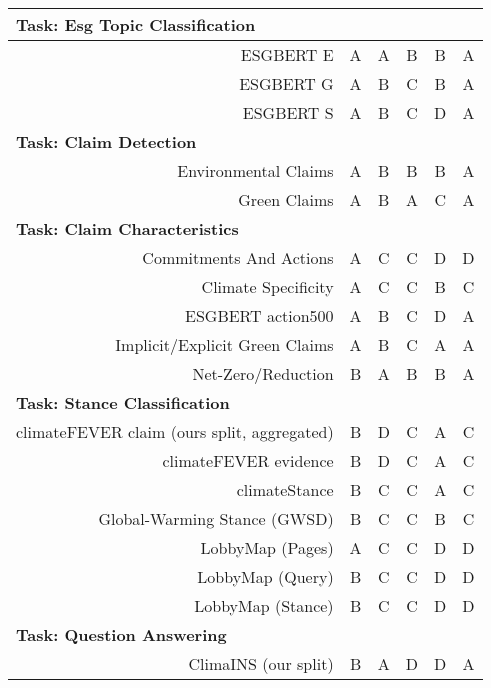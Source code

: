 \begin{table}[ht]
\begin{tabular}{rcccc|c}
\multicolumn{2}{l}{\textbf{Task: Esg Topic Classification}} \\
\hline
ESGBERT E \cite{schimanski_bridging_2023} & A & A & B & B & A \\
ESGBERT G \cite{schimanski_bridging_2023} & A & B & C & B & A \\
ESGBERT S \cite{schimanski_bridging_2023} & A & B & C & D & A \\
\multicolumn{2}{l}{\textbf{Task: Claim Detection}} \\
\hline
Environmental Claims \cite{stammbach_environmental_2023} & A & B & B & B & A \\
Green Claims \cite{vinicius_woloszyn_towards_2021} & A & B & A & C & A \\
\multicolumn{2}{l}{\textbf{Task: Claim Characteristics}} \\
\hline
Commitments And Actions \cite{bingler2023cheaptalkspecificitysentiment} & A & C & C & D & D \\
Climate Specificity \cite{bingler2023cheaptalkspecificitysentiment} & A & C & C & B & C \\
ESGBERT action500 \cite{schimanski_bridging_2023} & A & B & C & D & A \\
Implicit/Explicit Green Claims \cite{vinicius_woloszyn_towards_2021} & A & B & C & A & A \\
Net-Zero/Reduction \cite{tobias_schimanski_climatebert-netzero_2023} & B & A & B & B & A \\
\multicolumn{2}{l}{\textbf{Task: Stance Classification}} \\
\hline
climateFEVER claim (ours split, aggregated) \cite{diggelmann_climate-fever_2020} & B & D & C & A & C \\
climateFEVER evidence \cite{diggelmann_climate-fever_2020} & B & D & C & A & C \\
climateStance \cite{vaid-etal-2022-towards} & B & C & C & A & C \\
Global-Warming Stance (GWSD) \cite{luo_detecting_2020} & B & C & C & B & C \\
LobbyMap (Pages) \cite{morio2023an} & A & C & C & D & D \\
LobbyMap (Query) \cite{morio2023an} & B & C & C & D & D \\
LobbyMap (Stance) \cite{morio2023an} & B & C & C & D & D \\
\multicolumn{2}{l}{\textbf{Task: Question Answering}} \\
\hline
ClimaINS (our split) \cite{spokoyny2023answering} & B & A & D & D & A \\

\end{tabular}
\end{table}
